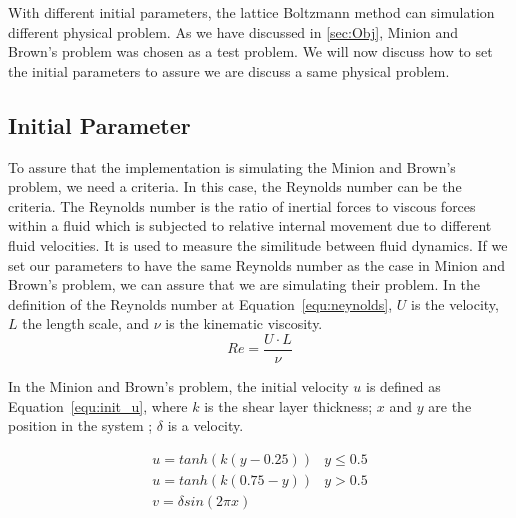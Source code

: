 With different initial parameters, the lattice Boltzmann method can simulation different physical problem. As we have discussed in \ref{sec:Obj}, Minion and Brown's problem\cite{minion1997performance} was chosen as a test problem. We will now discuss how to set the initial parameters to assure we are discuss a same physical problem.


\subsection{Initial Parameter}
To assure that the implementation is simulating the Minion and Brown's problem\cite{minion1997performance}, we need a criteria. In this case, the Reynolds number can be the criteria. The Reynolds number is the ratio of inertial forces to viscous forces within a fluid which is subjected to relative internal movement due to different fluid velocities\cite{munson2013fluid}. It is used to measure the similitude between fluid dynamics. If we set our parameters to have the same Reynolds number as the case in Minion and Brown's problem, we can assure that we are simulating their problem. In the definition of the Reynolds number at Equation~\ref{equ:neynolds}, $U$ is the velocity, $L$ the length scale, and $\nu$ is the kinematic viscosity.
\begin{equation}
\label{equ:neynolds}
    Re = \frac{U \cdot L}{\nu}
\end{equation}

In the Minion and Brown's problem, the initial velocity $u$ is defined as Equation~\ref{equ:init_u}, where $k$ is the shear layer thickness; $x$ and $y$ are the position in the system ; $\delta$ is a velocity. 

\begin{equation}
\label{equ:init_u}
    \begin{matrix}
u = tanh(k (y-0.25)) & y \leqslant 0.5 \\ 
u = tanh(k (0.75-y)) & y > 0.5  \\
v = \delta sin(2\pi x )
\end{matrix}
\end{equation}

